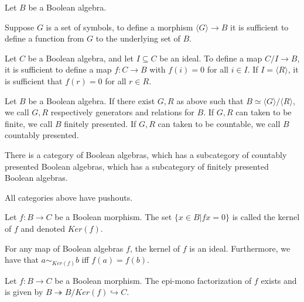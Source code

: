 \documentclass{../util/zariski-small}
\begin{document}
\begin{remark}\label{rmkMorphismsOutOfQuotient}
  Let $B$ be a Boolean algebra. 
  
  Suppose $G$ is a set of symbols, to define a morphism 
  $\langle G \rangle \to B$ it is sufficient to define 
  a function from $G$ to the underlying set of $B$. 

  Let $C$ be a Boolean algebra, and let $I\subseteq C$ be an ideal. 
  To define a map $C / I \to B$, it is sufficient to define a map $f:C\to B$
  with $f(i) = 0$ for all $i\in I$. 
  If $I = \langle R\rangle $, it is sufficient that $f(r) = 0$ for all $r\in R$. 
\end{remark}
\begin{definition}
  Let $B$ be a Boolean algebra. 
  If there exist $G, R$ as above such that 
  $B \simeq \langle G \rangle /\langle R \rangle$, 
  we call $G,R$ respectively generators and relations for $B$. 
  If $G,R$ can taken to be finite, we call $B$ finitely presented. 
  If $G,R$ can taken to be countable, we call $B$ countably presented. 
\end{definition}
\begin{remark}
  There is a category of Boolean algebras, which has a subcategory of countably presented Boolean algebras, 
  which has a subcategory of finitely presented Boolean algebras. 
\end{remark}
\begin{remark}\label{rmkBoolePushouts}
  All categories above have pushouts. 
\end{remark}
\begin{definition}
  Let $f:B\to C$ be a Boolean morphism. 
  The set $\{x \in B| fx = 0\}$ is called the kernel of $f$ and denoted 
  $Ker(f)$. 
\end{definition}
\begin{remark}
  For any map of Boolean algebras $f$, the kernel of $f$ is an ideal. 
  Furthermore, we have that $a\sim_{Ker(f)} b$ iff $f(a) = f(b)$. 
\end{remark}
\begin{remark}
  Let $f:B \to C$ be a Boolean morphism. 
  The epi-mono factorization of $f$ exists and is given by  
  $B \twoheadrightarrow B / Ker(f) \hookrightarrow C$.
\end{remark}
\end{document}
